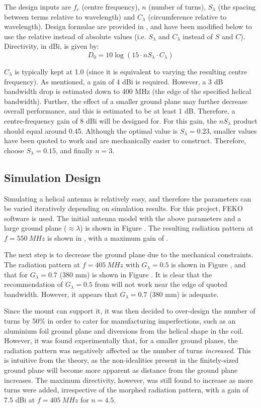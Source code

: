 
The design inputs are $f_c$ (centre frequency), $n$ (number of turns), $S_\lambda$ (the spacing between terms relative to wavelength) and $C_\lambda$ (circumference relative to wavelength). Design formulae are provided in \cite{textbook-antennaTheoryAnalysisDesign}, and have been modified below to use the relative instead of absolute values (i.e. $S_\lambda$ and $C_\lambda$ instead of $S$ and $C$). Directivity, in dBi, is given by:
$$
D_0 = 10 \log(15 \cdot n S_\lambda \cdot C_\lambda)
$$

$C_\lambda$ is typically kept at 1.0 (since it is equivalent to varying the resulting centre frequency). As mentioned, a gain of 4 dBi is required. However, a 3 dB bandwidth drop is estimated down to 400 MHz (the edge of the specified helical bandwidth). Further, the effect of a smaller ground plane may further decrease overall performance, and this is estimated to be at least 1 dB. Therefore, a centre-frequency gain of 8 dBi will be designed for. For this gain, the $n S_\lambda$ product should equal around 0.45. Although the optimal value is $S_\lambda = 0.23$, smaller values have been quoted to work and are mechanically easier to construct. Therefore, choose $S_\lambda = 0.15$, and finally $n = 3$.

\subsection{Simulation Design}
Simulating a helical antenna is relatively easy, and therefore the parameters can be varied iteratively depending on simulation results. For this project, FEKO software is used. The initial antenna model with the above parameters and a large ground plane ($\approx \lambda$) is shown in Figure . The resulting radiation pattern at $f = \SI{550}{MHz}$ is shown in , with a maximum gain of .

The next step is to decrease the ground plane due to the mechanical constraints. The radiation pattern at $f = \SI{405}{MHz}$ with $G_\lambda = 0.5$ is shown in Figure , and that for $G_\lambda = 0.7$ (380 mm) is shown in Figure . It is clear that the recommendation of $G_\lambda = 0.5$ from \cite{textbook-antennaTheoryAnalysisDesign} will not work near the edge of quoted bandwidth. However, it appears that $G_\lambda = 0.7$ (380 mm) is adequate.

Since the mount can support it, it was then decided to over-design the number of turns by 50\% in order to cater for manufacturing imperfections, such as an aluminium foil ground plane and diversions from the helical shape in the coil. However, it was found experimentally that, for a smaller ground planes, the radiation pattern was negatively affected as the number of turns \textit{increased}. This is intuitive from the theory, as the non-idealities present in the finitely-sized ground plane will become more apparent as distance from the ground plane increases. The maximum directivity, however, was still found to increase as more turns were added, irrespective of the morphed radiation pattern, with a gain of 7.5 dBi at $f = \SI{405}{MHz}$ for $n = 4.5$.

